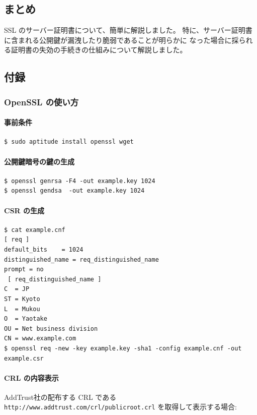 \documentclass[mingoth,a4paper]{jsarticle}
\begin{document}
\subsection{まとめ}
SSL のサーバー証明書について、簡単に解説しました。
特に、サーバー証明書に含まれる公開鍵が漏洩したり脆弱であることが明らかに
なった場合に採られる証明書の失効の手続きの仕組みについて解説しました。

\subsection{付録}
\subsubsection{OpenSSL の使い方}

\paragraph{事前条件}
\begin{verbatim}
$ sudo aptitude install openssl wget
\end{verbatim}


\paragraph{公開鍵暗号の鍵の生成}
\begin{verbatim}
$ openssl genrsa -F4 -out example.key 1024
$ openssl gendsa  -out example.key 1024
\end{verbatim}

\paragraph{CSR の生成}
\begin{verbatim}
$ cat example.cnf
[ req ]
default_bits	= 1024
distinguished_name = req_distinguished_name
prompt = no
 [ req_distinguished_name ]
C  = JP
ST = Kyoto
L  = Mukou
O  = Yaotake
OU = Net business division
CN = www.example.com
$ openssl req -new -key example.key -sha1 -config example.cnf -out example.csr
\end{verbatim}

\paragraph{CRL の内容表示}
\mbox{}\par
AddTrust社の配布する CRL である {\tt http://www.addtrust.com/crl/publicroot.crl}  を取得して表示する場合:
\end{document}
